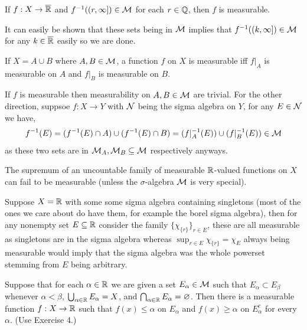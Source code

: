 \documentclass[12pt,a4paper]{article}
\begin{document}
\begin{problem}\label{prob:2-4}
If $f: X \to \overline{\mathbb{R}}$ and $f^{-1}((r, \infty]) \in \mathcal{M}$ for each $r \in \mathbb{Q}$, then $f$ is measurable.
\end{problem}
\begin{solution}
    It can easily be shown that these sets being in $\mathcal{M}$ implies that $f^{-1}((k,\infty])\in\mathcal{M}$ for any $k\in\overline{\mathbb{R}}$ easily so we are done.
\end{solution}
\begin{problem}\label{prob:2-5}
If $X = A \cup B$ where $A, B \in \mathcal{M}$, a function $f$ on $X$ is measurable iff $f|_A$ is measurable on $A$ and $f|_B$ is measurable on $B$.
\end{problem}
\begin{solution}
    If $f$ is measurable then measurability on $A,B\in\mathcal{M}$ are trivial.
    For the other direction, suppsoe $f:X\to Y$ with $\mathcal{N}$ being the sigma algebra on $Y$, for any $E\in\mathcal{N}$ we have,
    $$f^{-1}(E)=(f^{-1}(E)\cap A)\cup(f^{-1}(E)\cap B)=(f\vert_A^{-1}(E))\cup(f\vert_B^{-1}(E))\in\mathcal{M}$$
    as these two sets are in $\mathcal{M}_A,\mathcal{M}_B\subseteq\mathcal{M}$ respectively anyways.
\end{solution}
\begin{problem}\label{prob:2-6}
The supremum of an uncountable family of measurable $\mathbb{R}$-valued functions on $X$ can fail to be measurable (unless the $\sigma$-algebra $\mathcal{M}$ is very special).
\end{problem}
\begin{solution}
    Suppose $X=\mathbb{R}$ with some some sigma algebra containing singletons (most of the ones we care about do have them, for example the borel sigma algebra), then for any nonempty set $E\subseteq\mathbb{R}$ consider the family $\{\chi_{\{r\}}\}_{r\in E}$, these are all measurable as singletons are in the sigma algebra whereas $\sup_{r\in E}\chi_{\{r\}}=\chi_E$ always being measurable would imply that the sigma algebra was the whole powerset stemming from $E$ being arbitrary.
\end{solution}
\begin{problem}\label{prob:2-7}
Suppose that for each $\alpha \in \mathbb{R}$ we are given a set $E_\alpha \in \mathcal{M}$ such that $E_\alpha \subset E_\beta$ whenever $\alpha < \beta$, $\bigcup_{\alpha \in \mathbb{R}} E_\alpha = X$, and $\bigcap_{\alpha \in \mathbb{R}} E_\alpha = \varnothing$. Then there is a measurable function $f: X \to \mathbb{R}$ such that $f(x) \le \alpha$ on $E_\alpha$ and $f(x) \ge \alpha$ on $E_\alpha^c$ for every $\alpha$. (Use Exercise 4.)
\end{problem}
\end{document}
